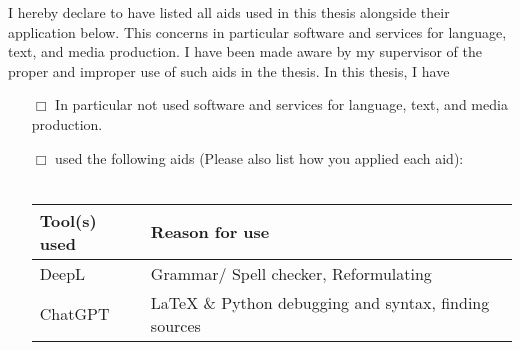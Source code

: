 I hereby declare to have listed all aids used in this thesis alongside their application below. This concerns in particular software and services for language, text, and media production. 
I have been made aware by my supervisor of the proper and improper use of such aids in the thesis.\newline
In this thesis, I have
\begin{itemize}
	\item[$\Box$] In particular not used software and services for language, text, and media production. 
	\item[$\Box$] 
	used the following aids (Please also list how you applied each aid):\\\\


\centering
\begin{tabular}{ll} 
\toprule
Tool(s) used & Reason for use  \\
\midrule
DeepL        & Grammar/ Spell checker, Reformulating            \\
ChatGPT      & LaTeX \& Python debugging and syntax, finding sources \\
            
\bottomrule
\end{tabular}
\end{itemize}


 \vspace{2cm}

